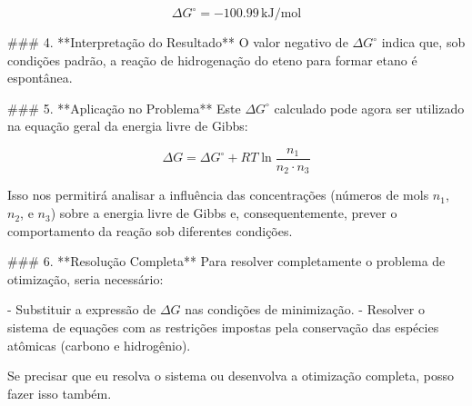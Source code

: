 \[
\Delta G^\circ = -100.99 \, \text{kJ/mol}
\]

### 4. **Interpretação do Resultado**
O valor negativo de \(\Delta G^\circ\) indica que, sob condições padrão, a reação de hidrogenação do eteno para formar etano é espontânea.

### 5. **Aplicação no Problema**
Este \(\Delta G^\circ\) calculado pode agora ser utilizado na equação geral da energia livre de Gibbs:

\[
\Delta G = \Delta G^\circ + RT \ln \frac{n_1}{n_2 \cdot n_3}
\]

Isso nos permitirá analisar a influência das concentrações (números de mols \(n_1\), \(n_2\), e \(n_3\)) sobre a energia livre de Gibbs e, consequentemente, prever o comportamento da reação sob diferentes condições.

### 6. **Resolução Completa**
Para resolver completamente o problema de otimização, seria necessário:

- Substituir a expressão de \(\Delta G\) nas condições de minimização.
- Resolver o sistema de equações com as restrições impostas pela conservação das espécies atômicas (carbono e hidrogênio).

Se precisar que eu resolva o sistema ou desenvolva a otimização completa, posso fazer isso também.